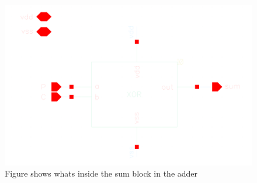 \begin{figure}[H]
  \centering
  \captionsetup{justification=centering}
  \includegraphics[clip,width=1.0\textwidth]{../figures/sum}
  \caption{Figure shows whats inside the sum block in the adder} \label{fig:sum}
\end{figure}
